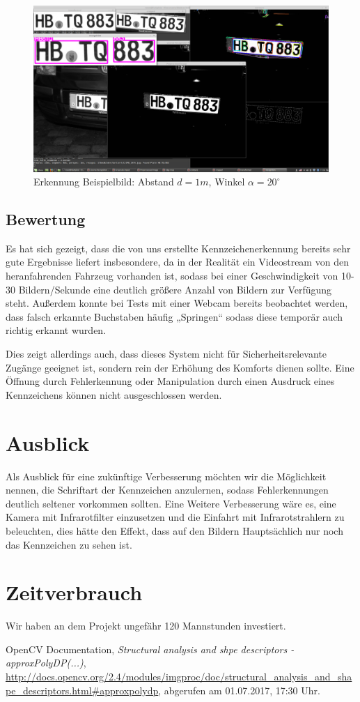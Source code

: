 \documentclass{../Vorlage/sebDenCls}
\begin{document}
\begin{figure}[htp]
	\centering 	
	\includegraphics[width=.9\textwidth]{Funktioniert_1975.png} 
	\caption{Erkennung Beispielbild: Abstand $d=1m$, Winkel $\alpha = 20^\circ$ \label{beispiel2}}
\end{figure}


\subsection{Bewertung}
Es hat sich gezeigt, dass die von uns erstellte Kennzeichenerkennung bereits sehr gute Ergebnisse liefert insbesondere, da in der Realität ein Videostream von den heranfahrenden Fahrzeug vorhanden ist, sodass bei einer Geschwindigkeit von 10-30 Bildern/Sekunde eine deutlich größere Anzahl von Bildern zur Verfügung steht. Außerdem konnte bei Tests mit einer Webcam bereits beobachtet werden, dass falsch erkannte Buchstaben häufig „Springen“ sodass diese temporär auch richtig erkannt wurden. 

Dies zeigt allerdings auch, dass dieses System nicht für Sicherheitsrelevante Zugänge geeignet ist, sondern rein der Erhöhung des Komforts dienen sollte. Eine Öffnung durch Fehlerkennung oder Manipulation durch einen Ausdruck eines Kennzeichens können nicht ausgeschlossen werden.
\section{Ausblick}
Als Ausblick für eine zukünftige Verbesserung möchten wir die Möglichkeit nennen, die Schriftart der Kennzeichen anzulernen, sodass Fehlerkennungen deutlich seltener vorkommen sollten.
Eine Weitere Verbesserung wäre es, eine Kamera mit Infrarotfilter einzusetzen und die Einfahrt mit Infrarotstrahlern zu beleuchten, dies hätte den Effekt, dass auf den Bildern Hauptsächlich nur noch das Kennzeichen zu sehen ist.

\section{Zeitverbrauch}
Wir haben an dem Projekt ungefähr 120 Mannstunden investiert.

\begin{thebibliography}{9}
	
	OpenCV Documentation,
	\emph{Structural analysis and shpe descriptors - approxPolyDP(...)},
	\url{http://docs.opencv.org/2.4/modules/imgproc/doc/structural_analysis_and_shape_descriptors.html#approxpolydp},
	abgerufen am 01.07.2017, 17:30 Uhr.
	
\end{thebibliography}
\end{document}
